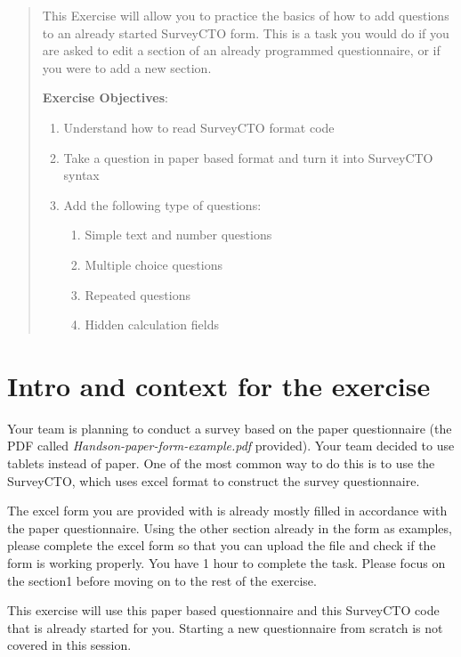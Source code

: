 \documentclass{tufte-handout}
\begin{document}
\begin{abstract}
This Exercise will allow you to practice the basics of how to add questions to an already started SurveyCTO form. This is a task you would do if you are asked to edit a section of an already programmed questionnaire, or if you were to add a new section.


\bigskip\noindent \textbf{Exercise Objectives}:
\begin{enumerate}
  \item Understand how to read SurveyCTO format code
  \item Take a question in paper based format and turn it into SurveyCTO syntax
  \item Add the following type of questions:
  \begin{enumerate}
  	\item Simple text and number questions
  	\item Multiple choice questions
  	\item Repeated questions
	\item Hidden calculation fields
  \end{enumerate}
\end{enumerate}
\end{abstract}

\section{Intro and context for the exercise}

Your team is planning to conduct a survey based on the paper questionnaire (the PDF called \textit{Handson-paper-form-example.pdf} provided). Your team decided to use tablets instead of paper. One of the most common way to do this is to use the SurveyCTO, which uses excel format to construct the survey questionnaire. 

The excel form you are provided with is already mostly filled in accordance with the paper questionnaire. Using the other section already in the form as examples, please complete the excel form so that you can upload the file and check if the form is working properly. You have 1 hour to complete the task. Please focus on the section1 before moving on to the rest of the exercise. 

This exercise will use this paper based questionnaire and this SurveyCTO code that is already started for you. Starting a new questionnaire from scratch is not covered in this session.
\end{document}

